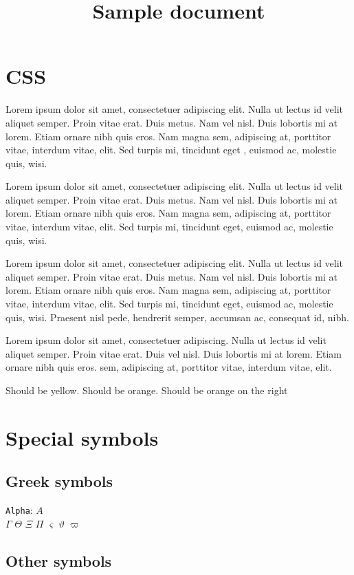 \documentclass[a4paper,11pt]{article}
\title{Sample document}
\begin{document}


\section{CSS}

Lorem ipsum dolor sit amet, consectetuer adipiscing elit.  Nulla ut lectus id velit aliquet semper. Proin vitae erat. Duis metus. Nam  vel nisl. Duis lobortis mi at lorem. Etiam ornare nibh quis eros. Nam magna  sem, adipiscing at, porttitor vitae, interdum vitae, elit. Sed turpis mi,  tincidunt eget , euismod ac, molestie quis, wisi.   

Lorem ipsum dolor sit amet, consectetuer adipiscing elit.  Nulla ut lectus id velit aliquet semper. Proin vitae erat. Duis metus. Nam  vel nisl. Duis lobortis mi at lorem. Etiam ornare nibh quis eros. Nam magna  sem, adipiscing at, porttitor vitae, interdum vitae, elit. Sed turpis mi,  tincidunt eget, euismod ac, molestie quis, wisi.   

Lorem ipsum dolor sit amet, consectetuer adipiscing elit.  Nulla ut lectus id velit aliquet semper. Proin vitae erat. Duis metus. Nam  vel nisl. Duis lobortis mi at lorem. Etiam ornare nibh quis eros. Nam magna  sem, adipiscing at, porttitor vitae, interdum vitae, elit. Sed turpis mi,  tincidunt eget, euismod ac, molestie quis, wisi. Praesent nisl pede,  hendrerit semper, accumsan ac, consequat id, nibh.

Lorem ipsum dolor sit amet, consectetuer adipiscing.  Nulla ut lectus id velit aliquet semper. Proin vitae erat. Duis  vel nisl. Duis lobortis mi at lorem. Etiam ornare nibh quis eros.  sem, adipiscing at, porttitor vitae, interdum vitae, elit.

Should be yellow. Should be orange. Should be orange on the right


\section{Special symbols}

\subsection{Greek symbols}

\texttt{Alpha}: $A$ 
\\ $\Gamma$ $\Theta$ $\Xi$ $\Pi$ $\varsigma$ $\vartheta$ $\varpi$

\subsection{Other symbols}
\end{document}
